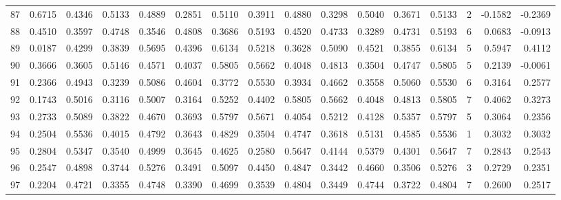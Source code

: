 \begin{tabular}{lrrrrrrrrrrrrrrr}
87  &      0.6715 &  0.4346 &  0.5133 &  0.4889 &  0.2851 &  0.5110 &  0.3911 &  0.4880 &  0.3298 &  0.5040 &   0.3671 &     0.5133 &      2 &                   -0.1582 &                    -0.2369 \\
88  &      0.4510 &  0.3597 &  0.4748 &  0.3546 &  0.4808 &  0.3686 &  0.5193 &  0.4520 &  0.4733 &  0.3289 &   0.4731 &     0.5193 &      6 &                    0.0683 &                    -0.0913 \\
89  &      0.0187 &  0.4299 &  0.3839 &  0.5695 &  0.4396 &  0.6134 &  0.5218 &  0.3628 &  0.5090 &  0.4521 &   0.3855 &     0.6134 &      5 &                    0.5947 &                     0.4112 \\
90  &      0.3666 &  0.3605 &  0.5146 &  0.4571 &  0.4037 &  0.5805 &  0.5662 &  0.4048 &  0.4813 &  0.3504 &   0.4747 &     0.5805 &      5 &                    0.2139 &                    -0.0061 \\
91  &      0.2366 &  0.4943 &  0.3239 &  0.5086 &  0.4604 &  0.3772 &  0.5530 &  0.3934 &  0.4662 &  0.3558 &   0.5060 &     0.5530 &      6 &                    0.3164 &                     0.2577 \\
92  &      0.1743 &  0.5016 &  0.3116 &  0.5007 &  0.3164 &  0.5252 &  0.4402 &  0.5805 &  0.5662 &  0.4048 &   0.4813 &     0.5805 &      7 &                    0.4062 &                     0.3273 \\
93  &      0.2733 &  0.5089 &  0.3822 &  0.4670 &  0.3693 &  0.5797 &  0.5671 &  0.4054 &  0.5212 &  0.4128 &   0.5357 &     0.5797 &      5 &                    0.3064 &                     0.2356 \\
94  &      0.2504 &  0.5536 &  0.4015 &  0.4792 &  0.3643 &  0.4829 &  0.3504 &  0.4747 &  0.3618 &  0.5131 &   0.4585 &     0.5536 &      1 &                    0.3032 &                     0.3032 \\
95  &      0.2804 &  0.5347 &  0.3540 &  0.4999 &  0.3645 &  0.4625 &  0.2580 &  0.5647 &  0.4144 &  0.5379 &   0.4301 &     0.5647 &      7 &                    0.2843 &                     0.2543 \\
96  &      0.2547 &  0.4898 &  0.3744 &  0.5276 &  0.3491 &  0.5097 &  0.4450 &  0.4847 &  0.3442 &  0.4660 &   0.3506 &     0.5276 &      3 &                    0.2729 &                     0.2351 \\
97  &      0.2204 &  0.4721 &  0.3355 &  0.4748 &  0.3390 &  0.4699 &  0.3539 &  0.4804 &  0.3449 &  0.4744 &   0.3722 &     0.4804 &      7 &                    0.2600 &                     0.2517 \\

\end{tabular}
